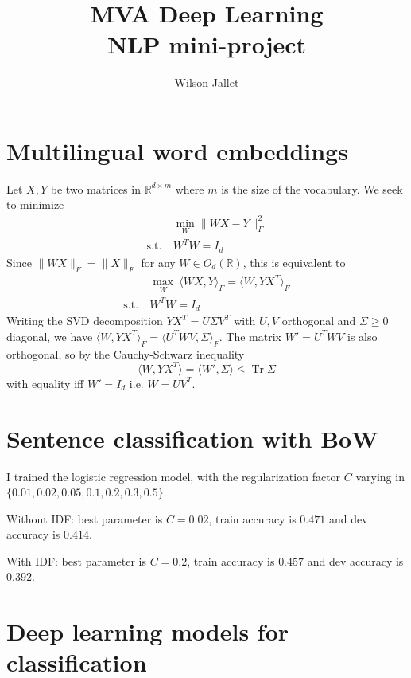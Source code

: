 \documentclass{article}
\title{MVA Deep Learning \\NLP mini-project}
\author{Wilson Jallet}
\newcommand\RR{\mathbb{R}}
\DeclareMathOperator{\trace}{\mathrm{Tr}}
\begin{document}
\maketitle

\section{Multilingual word embeddings}

Let $X,Y$ be two matrices in $\RR^{d\times m}$ where $m$ is the size of the vocabulary. We seek to minimize
\begin{equation}
\begin{aligned}
	&\min_W \| WX - Y \|_F^2  \\
	\mathrm{s.t.} \ & W^TW = I_d
\end{aligned}
\end{equation}
Since $\|WX\|_F = \|X\|_F$ for any $W \in O_d(\RR)$, this is equivalent to
\[
\begin{aligned}
	&\max_W~ \langle WX,Y\rangle_F = \langle W, YX^T\rangle_F  \\
	\mathrm{s.t.}\ & W^TW = I_d
\end{aligned}
\]
Writing the SVD decomposition $YX^T = U\Sigma V^T$ with $U,V$ orthogonal and $\Sigma \geq 0$ diagonal, we have $\langle W,YX^T\rangle_F = \langle U^T WV, \Sigma \rangle_F $. The matrix $W' = U^TWV$ is also orthogonal, so by the Cauchy-Schwarz inequality
\[
	\langle W, YX^T\rangle = \langle W', \Sigma \rangle \leq \trace \Sigma
\]
with equality iff $W' = I_d$ i.e. $W = UV^T$.



\section{Sentence classification with BoW}

I trained the logistic regression model, with the regularization factor $C$ varying in $\{0.01, 0.02, 0.05, 0.1, 0.2, 0.3, 0.5\}$.

Without IDF: best parameter is $C = 0.02$, train accuracy is $0.471$ and dev accuracy is $0.414$.

With IDF: best parameter is $C=0.2$, train accuracy is $0.457$ and dev accuracy is $0.392$.



\section{Deep learning models for classification}
\end{document}
